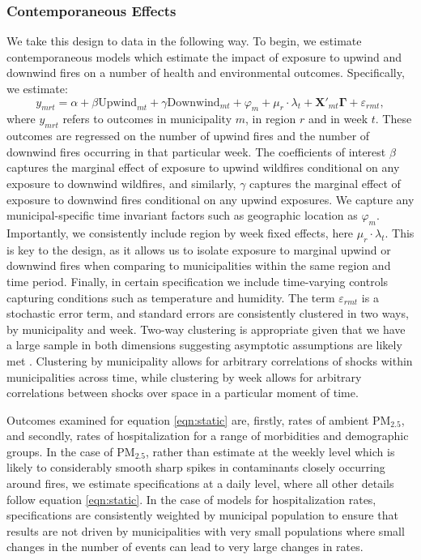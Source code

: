 \documentclass[11pt]{article}
\begin{document}
\begin{spacing}{1.5}
\subsubsection{Contemporaneous Effects}
We take this design to data in the following way.  To begin, we estimate contemporaneous models which estimate the impact of exposure to upwind and downwind fires on a number of health and environmental outcomes.  Specifically, we estimate:
\begin{equation}
\label{eqn:static}
y_{mrt}=\alpha + \beta\text{Upwind}_{mt} + \gamma\text{Downwind}_{mt} + \varphi_m + \mu_r\cdot\lambda_t + \bm{X}'_{mt}\bm{\Gamma} + \varepsilon_{rmt},
\end{equation}
where $y_{mrt}$ refers to outcomes in municipality $m$, in region $r$ and in week $t$.  These outcomes are regressed on the number of upwind fires and the number of downwind fires occurring in that particular week.  The coefficients of interest $\beta$ captures the marginal effect of exposure to upwind wildfires conditional on any exposure to downwind wildfires, and similarly, $\gamma$ captures the marginal effect of exposure to downwind fires conditional on any upwind exposures.  We capture any municipal-specific time invariant factors such as geographic location as $\varphi_m$.  Importantly, we consistently include region by week fixed effects, here $\mu_r\cdot\lambda_t$.  This is key to the design, as it allows us to isolate exposure to marginal upwind or downwind fires when comparing to municipalities within the same region and time period.  Finally, in certain specification we include time-varying controls capturing conditions such as temperature and humidity. The term $\varepsilon_{rmt}$ is a stochastic error term, and standard errors are consistently clustered in two ways, by municipality and week.  Two-way clustering is appropriate given that we have a large sample in both dimensions suggesting asymptotic assumptions are likely met \citep{CameronMiller2015}.  Clustering by municipality allows for arbitrary correlations of shocks within municipalities across time, while clustering by week allows for arbitrary correlations between shocks over space in a particular moment of time. 

Outcomes examined for equation \ref{eqn:static} are, firstly, rates of ambient PM$_{2.5}$, and secondly, rates of hospitalization for a range of morbidities and demographic groups.  In the case of PM$_{2.5}$, rather than estimate at the weekly level which is likely to considerably smooth sharp spikes in contaminants closely occurring around fires, we estimate specifications at a daily level, where all other details follow equation \ref{eqn:static}. In the case of models for hospitalization rates, specifications are consistently weighted by municipal population to ensure that results are not driven by municipalities with very small populations where small changes in the number of events can lead to very large changes in rates.


\end{spacing}
\end{document}
